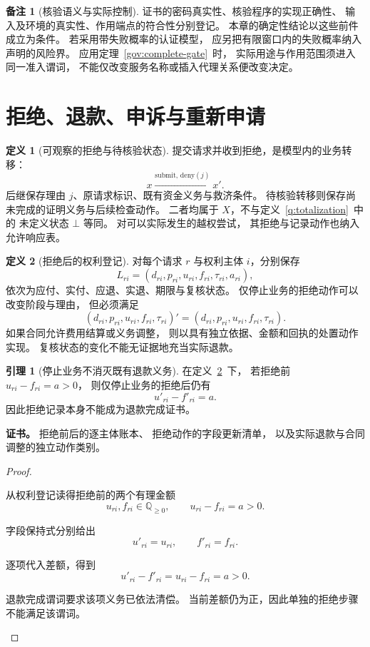 \documentclass[UTF8,12pt,a4paper,openany,fontset=none,zihao=false]{ctexrep}
\theoremstyle{definition}
\newtheorem{definition}{定义}[chapter]
\newtheorem{lemma}{引理}[chapter]
\newtheorem{remark}{备注}[chapter]
\newenvironment{certificate}{\par\noindent\textbf{证书。}\ignorespaces}{\par}
\newcommand{\1}{\mathbf 1}
\begin{document}
\begin{remark}[核验语义与实际控制]
证书的密码真实性、核验程序的实现正确性、
输入及环境的真实性、作用端点的符合性分别登记。
本章的确定性结论以这些前件成立为条件。
若采用带失败概率的认证模型，
应另把有限窗口内的失败概率纳入声明的风险界。
应用定理~\ref{gov:complete-gate}~时，
实际用途与作用范围须进入同一准入谓词，
不能仅改变服务名称或插入代理关系便改变决定。
\end{remark}

\section{拒绝、退款、申诉与重新申请}

\begin{definition}[可观察的拒绝与待核验状态]
\label{svc:denied-state}
提交请求并收到拒绝，是模型内的业务转移：
\[
x\xrightarrow{\mathrm{submit},\,\mathrm{deny}(j)}x'.
\]
后继保存理由 \(j\)、原请求标识、既有资金义务与救济条件。
待核验转移则保存尚未完成的证明义务与后续检查动作。
二者均属于 \(X\)，不与定义~\ref{q:totalization}~中的
未定义状态 \(\bot\) 等同。
对可以实际发生的越权尝试，
其拒绝与记录动作也纳入允许响应表。
\end{definition}

\begin{definition}[拒绝后的权利登记]
\label{svc:rights}
对每个请求 \(r\) 与权利主体 \(i\)，分别保存
\[
L_{ri}=(d_{ri},p_{ri},u_{ri},f_{ri},\tau_{ri},a_{ri}),
\]
依次为应付、实付、应退、实退、期限与复核状态。
仅停止业务的拒绝动作可以改变阶段与理由，
但必须满足
\[
(d_{ri},p_{ri},u_{ri},f_{ri},\tau_{ri})'
=(d_{ri},p_{ri},u_{ri},f_{ri},\tau_{ri}).
\]
如果合同允许费用结算或义务调整，
则以具有独立依据、金额和回执的处置动作实现。
复核状态的变化不能无证据地充当实际退款。
\end{definition}

\begin{lemma}[停止业务不消灭既有退款义务]
\label{svc:denial-rights}
在定义~\ref{svc:rights}~下，
若拒绝前 \(u_{ri}-f_{ri}=a>0\)，
则仅停止业务的拒绝后仍有
\[
u'_{ri}-f'_{ri}=a.
\]
因此拒绝记录本身不能成为退款完成证书。
\end{lemma}
\begin{certificate}
拒绝前后的逐主体账本、
拒绝动作的字段更新清单，
以及实际退款与合同调整的独立动作类别。
\end{certificate}
\begin{proof}
\begin{semanticsteps}
\item 从权利登记读得拒绝前的两个有理金额
\[
u_{ri},f_{ri}\in\mathbb Q_{\ge0},
\qquad u_{ri}-f_{ri}=a>0.
\]
\item 字段保持式分别给出
\[
u'_{ri}=u_{ri},\qquad f'_{ri}=f_{ri}.
\]
\item 逐项代入差额，得到
\[
u'_{ri}-f'_{ri}
=u_{ri}-f_{ri}
=a>0.
\]
\item 退款完成谓词要求该项义务已依法清偿。
当前差额仍为正，因此单独的拒绝步骤不能满足该谓词。
\end{semanticsteps}
\end{proof}
\end{document}
